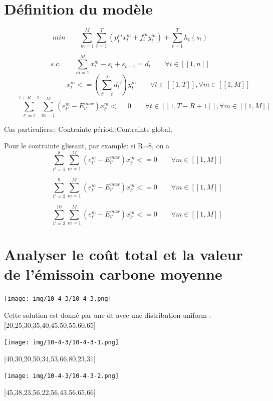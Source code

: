 \documentclass[12pt,a4paper]{article}
\begin{document}
\thispagestyle{empty}
\newpage


\section{Définition du modèle}
\[
	min\qquad \sum_{m=1}^M \sum_{t=1}^T (p_t^mx_t^m + f_t^my_t^m)+ \sum_{t=1}^T h_t(s_t)
\]

\[
	s.c.\qquad \sum_{m=1}^M x_t^m - s_t+s_{t-1}=d_t\qquad \forall i \in [\![1,n]\!]
\]
\[
	\qquad \qquad \qquad \qquad x_t^m<=(\sum_{t'=t}^T d_t')y_t^m\qquad \forall t \in [\![1,T]\!],\forall m \in [\![1,M]\!]
\]
\[
	\qquad \sum_{t'=t}^{t+R-1}\sum_{m=1}^M(e_{t'}^m-E_{t'}^{max})x_{t'}^m<=0\qquad \forall t \in [\![1,T-R+1]\!],\forall m \in [\![1,M]\!]
\]

\begin{flushright}
Cas particuliers:\newline
[R=1]: Contrainte périod;\newline
[R=T]:Contrainte global;\newline
\end{flushright}


Pour le contrainte glissant,  par example: si R=8, on a
\[
	\qquad \sum_{t'=1}^{8}\sum_{m=1}^M(e_{t'}^m-E^{max}_{t'})x_{t'}^m<=0\qquad \forall m \in [\![1,M]\!]
\]

\[
	\qquad \sum_{t'=2}^{9}\sum_{m=1}^M(e_{t'}^m-E^{max}_{t'})x_{t'}^m<=0\qquad \forall m \in [\![1,M]\!]
\]

\[
	\qquad \sum_{t'=3}^{10}\sum_{m=1}^M(e_{t'}^m-E^{max}_{t'})x_{t'}^m<=0\qquad \forall m \in [\![1,M]\!]
\]
\newpage
\section{Analyser le coût total et la valeur de l'émissoin carbone moyenne}

 \begin{minipage}[r]{.99\linewidth}
	\center\texttt{[image: img/10-4-3/10-4-3.png]}
\begin{center}
Cette solution est donné par une dt avec une distribution uniform :
[20,25,30,35,40,45,50,55,60,65]
\end{center}

\end{minipage}
\begin{minipage}[b]{.48\linewidth}
	\center\texttt{[image: img/10-4-3/10-4-3-1.png]}
	\begin{center}
	[40,30,20,50,34,53,66,80,23,31]
	\end{center}
\end{minipage}
\begin{minipage}[b]{.48\linewidth}
	\center\texttt{[image: img/10-4-3/10-4-3-2.png]}
	\begin{center}
	[45,38,23,56,22,56,43,56,65,66]
\end{center}
\end{minipage}
\end{document}
